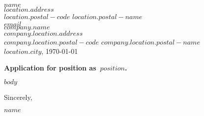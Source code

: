 \documentclass[]{$documentclass$}
\def\thetitle{Søknad om stilling som}
\def\sign{Med vennlig hilsen}
\def\thetitle{Application for position as}
\def\sign{Sincerely}
\begin{document}
{\selectfont\thispagestyle{empty}
    $name$\\
    $location.address$\\
    $location.postal-code$ $location.postal-name$\\
    $email$\\

    $company.name$\\
    $company.location.address$\\
    $company.location.postal-code$ $company.location.postal-name$\\

    
    \hfill $location.city$, \today

    \vspace{1em}
    {\Large\textbf{\thetitle\ $position$.}}

    $body$

    \vspace{2em}
    \sign,
    
    $name$

}
\end{document}
